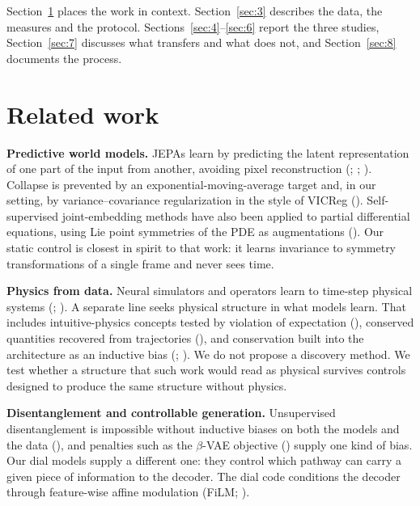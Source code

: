 \documentclass[10pt]{article}
\begin{document}
Section~\ref{sec:2} places the work in context. Section~\ref{sec:3} describes the data, the measures and the protocol. Sections~\ref{sec:4}--\ref{sec:6} report the three studies, Section~\ref{sec:7} discusses what transfers and what does not, and Section~\ref{sec:8} documents the process.

\section{Related work}\label{sec:2}

\textbf{Predictive world models.} JEPAs learn by predicting the latent representation of one part of the input from another, avoiding pixel reconstruction (\citealp{lecun2022path}; \citealp{assran2023ijepa}; \citealp{bardes2024vjepa}). Collapse is prevented by an exponential-moving-average target and, in our setting, by variance--covariance regularization in the style of VICReg (\citealp{bardes2022vicreg}). Self-supervised joint-embedding methods have also been applied to partial differential equations, using Lie point symmetries of the PDE as augmentations (\citealp{mialon2023lie}). Our static control is closest in spirit to that work: it learns invariance to symmetry transformations of a single frame and never sees time.

\textbf{Physics from data.} Neural simulators and operators learn to time-step physical systems (\citealp{sanchezgonzalez2020gns}; \citealp{li2021fno}). A separate line seeks physical structure in what models learn. That includes intuitive-physics concepts tested by violation of expectation (\citealp{piloto2022intuitive}), conserved quantities recovered from trajectories (\citealp{liu2021conservation}), and conservation built into the architecture as an inductive bias (\citealp{greydanus2019hnn}; \citealp{alet2021noether}). We do not propose a discovery method. We test whether a structure that such work would read as physical survives controls designed to produce the same structure without physics.

\textbf{Disentanglement and controllable generation.} Unsupervised disentanglement is impossible without inductive biases on both the models and the data (\citealp{locatello2019challenging}), and penalties such as the $\beta$-VAE objective (\citealp{higgins2017betavae}) supply one kind of bias. Our dial models supply a different one: they control which pathway can carry a given piece of information to the decoder. The dial code conditions the decoder through feature-wise affine modulation (FiLM; \citealp{perez2018film}).
\end{document}
